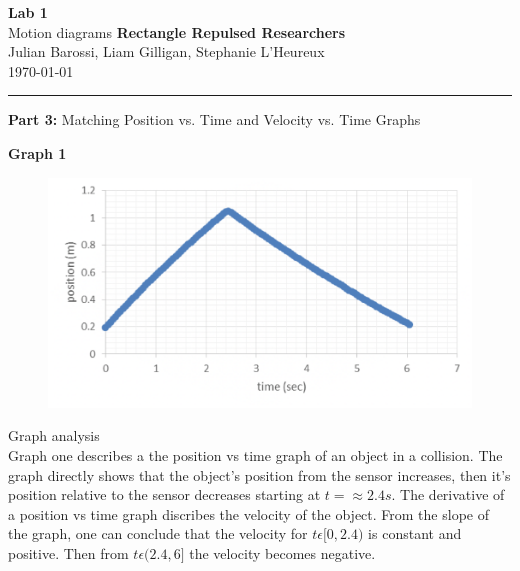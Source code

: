\documentclass[12pt, letterpaper]{article}
\begin{document}
  \begin{titlepage} 
    \begin{center}
      \Huge{\textbf{Lab 1}}\\
      \Huge{Motion diagrams}
      \vfill
      \large{\textbf{Rectangle Repulsed Researchers}}\\
      \large{Julian Barossi, Liam Gilligan, Stephanie L'Heureux}\\
      \vspace*{0.5cm}
      \normalsize
      \today
    \end{center}
  \end{titlepage}

  \begin{center}
    \rule{\textwidth}{0.5pt}
    \normalsize{\textbf{Part 3:} Matching Position vs. Time and Velocity vs. Time Graphs}\\
    \vspace{0.5cm}
  \end{center}

  \begin{center}
    \Large\textbf{{Graph 1}}\\
  \end{center}

  \begin{figure}[H]
    \centering 
    \includegraphics[width=\linewidth]{graph_1.png}
    \label{fig:graph1}
  \end{figure}


  \large{Graph analysis}\\
  Graph one describes a the position vs time graph of an object in a collision.
  The graph directly shows that the object's position from the sensor increases, 
  then it's position relative to the sensor decreases starting at $t=\approx2.4s$.
  The derivative of a position vs time graph discribes the velocity of the object. 
  From the slope of the graph, one can conclude that the velocity for $t \epsilon [0, 2.4)$
  is constant and positive. Then from $t\epsilon(2.4, 6]$ the velocity becomes negative.
  \\
\end{document}
